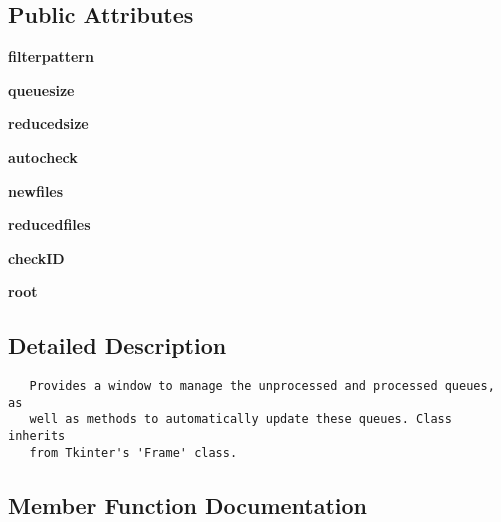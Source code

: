 \subsection*{Public Attributes}
\begin{CompactItemize}
\item 
\textbf{filterpattern}\label{classautoQueue_1_1window_2c6966db2ae8251f70d9c1c8c7673d44}

\item 
\textbf{queuesize}\label{classautoQueue_1_1window_782e915f368466d2520ca4bde42d55c7}

\item 
\textbf{reducedsize}\label{classautoQueue_1_1window_e053e1e70de057a0be4c4869d0eec810}

\item 
\textbf{autocheck}\label{classautoQueue_1_1window_98b87f8b2d8858d814f75d8450c6e72b}

\item 
\textbf{newfiles}\label{classautoQueue_1_1window_9d59335fec278298ad6bbc6ab8eadbf7}

\item 
\textbf{reducedfiles}\label{classautoQueue_1_1window_ef6f941e2752b7104cb3b2b9d49e3c35}

\item 
\textbf{check\-ID}\label{classautoQueue_1_1window_95334378a838a39f3a5b9e0c5d31469c}

\item 
\textbf{root}\label{classautoQueue_1_1window_c9a07eca0e452cc5dc853daf0977de26}

\end{CompactItemize}


\subsection{Detailed Description}


\footnotesize\begin{verbatim}
   Provides a window to manage the unprocessed and processed queues, as
   well as methods to automatically update these queues. Class inherits
   from Tkinter's 'Frame' class.
\end{verbatim}
\normalsize
 



\subsection{Member Function Documentation}
